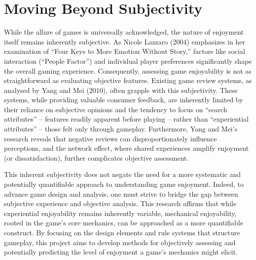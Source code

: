 \documentclass[12pt]{report}
\begin{document}
	\section{Moving Beyond Subjectivity}
	While the allure of games is universally acknowledged, the nature of enjoyment itself remains inherently subjective. As Nicole Lazzaro (2004) emphasizes in her examination of “Four Keys to More Emotion Without Story,” factors like social interaction (``People Factor'') and individual player preferences significantly shape the overall gaming experience. Consequently, assessing game enjoyability is not as straightforward as evaluating objective features. Existing game review systems, as analysed by Yang and Mei (2010), often grapple with this subjectivity. These systems, while providing valuable consumer feedback, are inherently limited by their reliance on subjective opinions and the tendency to focus on “search attributes” – features readily apparent before playing – rather than “experiential attributes” – those felt only through gameplay. Furthermore, Yang and Mei’s research reveals that negative reviews can disproportionately influence perceptions, and the network effect, where shared experiences amplify enjoyment (or dissatisfaction), further complicates objective assessment.
	
	This inherent subjectivity does not negate the need for a more systematic and potentially quantifiable approach to understanding game enjoyment. Indeed, to advance game design and analysis, one must strive to bridge the gap between subjective experience and objective analysis. This research affirms that while experiential enjoyability remains inherently variable, mechanical enjoyability, rooted in the game's core mechanics, can be approached as a more quantifiable construct. By focusing on the design elements and rule systems that structure gameplay, this project aims to develop methods for objectively assessing and potentially predicting the level of enjoyment a game's mechanics might elicit.
	
\end{document}
